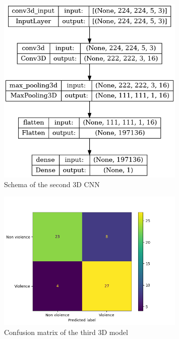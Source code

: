 \begin{figure}[]
    \centering
    \includegraphics[width=0.8\textwidth, height=0.6\textwidth, keepaspectratio]{images/3D3CNNschema.png}
    \caption{Schema of the second 3D CNN}
    \label{fig:3D3CNNschema}
\end{figure}


\begin{figure}[]
    \centering
    \includegraphics[width=0.8\textwidth]{images/71d5-testGiacomo3D3-9fcf-conf_matrix.png}
    \caption{Confusion matrix of the third 3D model}
    \label{fig:Third3DCNNconfusionMatrix}
\end{figure}



